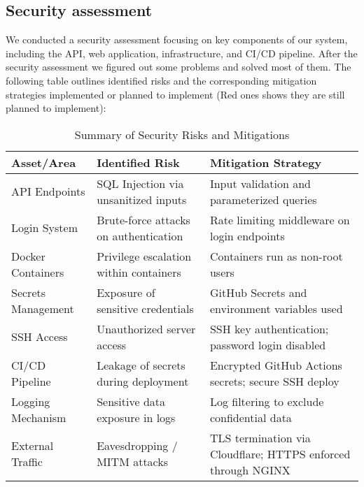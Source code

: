 \subsection{Security assessment}
We conducted a security assessment focusing on key components of our system, including the API, web application, infrastructure, and CI/CD pipeline. After the security assessment we figured out some problems and solved most of them. The following table outlines identified risks and the corresponding mitigation strategies implemented or planned to implement (Red ones shows they are still planned to implement):

\begin{table}[H]
\centering
\renewcommand{\arraystretch}{1.4}
\begin{tabular}{|>{\centering\arraybackslash}p{3.5cm}|>{\centering\arraybackslash}p{6cm}|>{\centering\arraybackslash}p{6cm}|}
\hline
\textbf{Asset/Area} & \textbf{Identified Risk} & \textbf{Mitigation Strategy} \\
\hline
API Endpoints & SQL Injection via unsanitized inputs & Input validation and parameterized queries \\
\hline
\color{red}Login System & \color{red} Brute-force attacks on authentication & \color{red} Rate limiting middleware on login endpoints \\
\hline
\color{red} Docker Containers & \color{red} Privilege escalation within containers & \color{red} Containers run as non-root users \\
\hline
Secrets Management & Exposure of sensitive credentials & GitHub Secrets and environment variables used \\
\hline
SSH Access & Unauthorized server access & SSH key authentication; password login disabled \\
\hline
CI/CD Pipeline & Leakage of secrets during deployment & Encrypted GitHub Actions secrets; secure SSH deploy \\
\hline
Logging Mechanism & Sensitive data exposure in logs & Log filtering to exclude confidential data \\
\hline
External Traffic & Eavesdropping / MITM attacks & TLS termination via Cloudflare; HTTPS enforced through NGINX \\
\hline
\end{tabular}
\caption{Summary of Security Risks and Mitigations}
\end{table}



